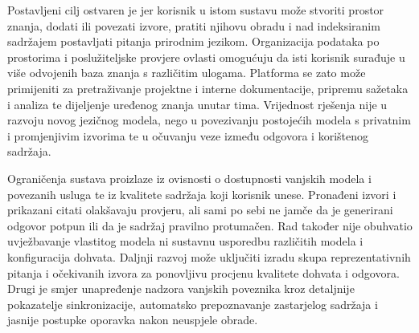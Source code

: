 Postavljeni cilj ostvaren je jer korisnik u istom sustavu može stvoriti prostor znanja, dodati ili povezati izvore, pratiti njihovu obradu i nad indeksiranim sadržajem postavljati pitanja prirodnim jezikom. Organizacija podataka po prostorima i poslužiteljske provjere ovlasti omogućuju da isti korisnik surađuje u više odvojenih baza znanja s različitim ulogama. Platforma se zato može primijeniti za pretraživanje projektne i interne dokumentacije, pripremu sažetaka i analiza te dijeljenje uređenog znanja unutar tima. Vrijednost rješenja nije u razvoju novog jezičnog modela, nego u povezivanju postojećih modela s privatnim i promjenjivim izvorima te u očuvanju veze između odgovora i korištenog sadržaja.

Ograničenja sustava proizlaze iz ovisnosti o dostupnosti vanjskih modela i povezanih usluga te iz kvalitete sadržaja koji korisnik unese. Pronađeni izvori i prikazani citati olakšavaju provjeru, ali sami po sebi ne jamče da je generirani odgovor potpun ili da je sadržaj pravilno protumačen. Rad također nije obuhvatio uvježbavanje vlastitog modela ni sustavnu usporedbu različitih modela i konfiguracija dohvata. Daljnji razvoj može uključiti izradu skupa reprezentativnih pitanja i očekivanih izvora za ponovljivu procjenu kvalitete dohvata i odgovora. Drugi je smjer unapređenje nadzora vanjskih poveznika kroz detaljnije pokazatelje sinkronizacije, automatsko prepoznavanje zastarjelog sadržaja i jasnije postupke oporavka nakon neuspjele obrade.
